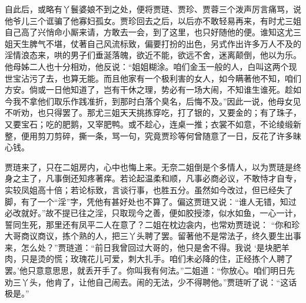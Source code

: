 \begin{parag}


    自此后，或略有丫鬟婆娘不到之处，便将贾琏、贾珍、贾蓉三个泼声厉言痛骂，说他爷儿三个诓骗了他寡妇孤女。贾珍回去之后，以后亦不敢轻易再来，有时尤三姐自己高了兴悄命小厮来请，方敢去一会，到了这里，也只好随他的便。谁知这尤三姐天生脾气不堪，仗著自己风流标致，偏要打扮的出色，另式作出许多万人不及的淫情浪态来，哄的男子们垂涎落魄，欲近不能，欲远不舍，迷离颠倒，他以为乐。他母姊二人也十分相劝，他反说：“姐姐糊涂。咱们金玉一般的人，白叫这两个现世宝沾污了去，也算无能。而且他家有一个极利害的女人，如今瞒著他不知，咱们方安。倘或一日他知道了，岂有干休之理，势必有一场大闹，不知谁生谁死。趁如今我不拿他们取乐作践准折，到那时白落个臭名，后悔不及。”因此一说，他母女见不听劝，也只得罢了。那尤三姐天天挑拣穿吃，打了银的，又要金的；有了珠子，又要宝石；吃的肥鹅，又宰肥鸭。或不趁心，连桌一推；衣裳不如意，不论绫缎新整，便用剪刀剪碎，撕一条，骂一句，究竟贾珍等何曾随意了一日，反花了许多昧心钱。
\end{parag}


\begin{parag}


    贾琏来了，只在二姐房内，心中也悔上来。无奈二姐倒是个多情人，以为贾琏是终身之主了，凡事倒还知疼著痒。若论起温柔和顺，凡事必商必议，不敢恃才自专，实较凤姐高十倍；若论标致，言谈行事，也胜五分。虽然如今改过，但已经失了脚，有了一个“淫”字，凭他有甚好处也不算了。偏这贾琏又说：“谁人无错，知过必改就好。”故不提已往之淫，只取现今之善，便如胶授漆，似水如鱼，一心一计，誓同生死，那里还有凤平二人在意了？二姐在枕边衾内，也常劝贾琏说： “你和珍大哥商议商议，拣个熟的人，把三丫头聘了罢。留著他不是常法子，终久要生出事来，怎么处？”贾琏道：“前日我曾回过大哥的，他只是舍不得。我说 ‘是块肥羊肉，只是烫的慌；玫瑰花儿可爱，刺大扎手。咱们未必降的住，正经拣个人聘了罢。’他只意意思思，就丢开手了。你叫我有何法。”二姐道：“你放心。咱们明日先劝三丫头，他肯了，让他自己闹去。闹的无法，少不得聘他。”贾琏听了说：“这话极是。”
\end{parag}


